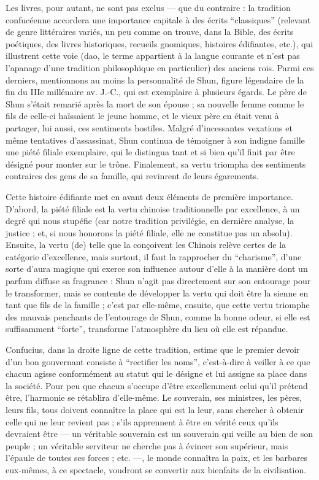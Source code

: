 \documentclass[11pt,a4paper]{article} %
\begin{document}
Les livres, pour autant, ne sont pas exclus --- que du contraire : la tradition confucéenne
accordera une importance capitale à des écrits ``classiques'' (relevant de genre littéraires
variés, un peu comme on trouve, dans la Bible, des écrits poétiques, des livres historiques,
recueils gnomiques, histoires édifiantes, etc.), qui illustrent cette voie (dao, le terme
appartient à la langue courante et n'est pas l'apanage d'une tradition philosophique en
particulier) des anciens rois.
Parmi ces derniers, mentionnons au moins la personnalité de
Shun, figure légendaire de la fin du IIIe millénaire av. J.-C., qui est exemplaire à plusieurs
égards.
Le père de Shun s'était remarié après la mort de son épouse ; sa nouvelle femme
comme le fils de celle-ci haïssaient le jeune homme, et le vieux père en était venu à
partager, lui aussi, ces sentiments hostiles.
Malgré d'incessantes vexations et même tentatives
d'assassinat, Shun continua de témoigner à son indigne famille une piété filiale
exemplaire, qui le distingua tant et si bien qu'il finit par être désigné pour monter sur le
trône.
Finalement, sa vertu triompha des sentiments contraires des gens de sa famille, qui
revinrent de leurs égarements.

Cette histoire édifiante met en avant deux éléments de première importance.
D'abord, la
piété filiale est la vertu chinoise traditionnelle par excellence, à un degré qui nous stupéfie
(car notre tradition privilégie, en dernière analyse, la justice ; et, si nous honorons la piété
filiale, elle ne constitue pas un absolu).
Ensuite, la vertu (de) telle que la conçoivent les
Chinois relève certes de la catégorie d'excellence, mais surtout, il faut la rapprocher du
``charisme'', d'une sorte d'aura magique qui exerce son influence autour d'elle à la manière
dont un parfum diffuse sa fragrance : Shun n'agit pas directement sur son entourage
pour le transformer, mais se contente de développer la vertu qui doit être la sienne en tant
que fils de la famille ; c'est par elle-même, ensuite, que cette vertu triomphe des mauvais
penchants de l'entourage de Shun, comme la bonne odeur, si elle est suffisamment
``forte'', transforme l'atmosphère du lieu où elle est répandue.

Confucius, dans la droite ligne de cette tradition, estime que le premier devoir d'un bon
gouvernant consiste à ``rectifier les noms'', c'est-à-dire à veiller à ce que
chacun agisse conformément au statut qui le désigne et lui assigne sa place dans la société.
Pour peu que chacun s'occupe d'être excellemment celui qu'il prétend être, l'harmonie
se rétablira d'elle-même.
Le souverain, ses ministres, les pères, leurs fils, tous doivent
connaître la place qui est la leur, sans chercher à obtenir celle qui ne leur revient pas ; s'ils
apprennent à être en vérité ceux qu'ils devraient être --- un véritable souverain est un souverain
qui veille au bien de son peuple ; un véritable serviteur ne cherche pas à évincer
son supérieur, mais l'épaule de toutes ses forces ; etc. ---, le monde connaîtra la paix, et les
barbares eux-mêmes, à ce spectacle, voudront se convertir aux bienfaits de la civilisation.
\end{document}
